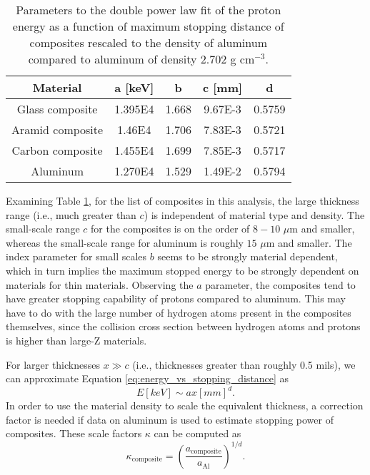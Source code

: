 \documentclass{hitec}
\begin{document}
\begin{table}[h]\centering
	\caption{Parameters to the double power law fit of the proton energy as a function of maximum stopping distance of composites rescaled to the density of aluminum compared to aluminum of density $2.702$ g cm$^{-3}$.}\label{tab:stopping_distance_rescaled}
	\begin{tabular}{|c | c | c | c | c |}\hline
		Material & a [keV] & b & c [mm] & d \\\hline
		Glass composite  & 1.395E4 & 1.668 & 9.67E-3 & 0.5759 \\\hline
		Aramid composite & 1.46E4  & 1.706 & 7.83E-3 & 0.5721  \\\hline
		Carbon composite & 1.455E4 & 1.699 & 7.85E-3 & 0.5717 \\\hline
		Aluminum         & 1.270E4 & 1.529 & 1.49E-2 & 0.5794 \\\hline
	\end{tabular}
\end{table}

Examining Table \ref{tab:stopping_distance_rescaled}, for the list of composites in this analysis, the large thickness range (i.e., much greater than $c$) is independent of material type and density. The small-scale range $c$ for the composites is on the order of $8-10$ $\mu$m and smaller, whereas the small-scale range for aluminum is roughly $15$ $\mu$m and smaller. The index parameter for small scales $b$ seems to be strongly material dependent, which in turn implies the maximum stopped energy to be strongly dependent on materials for thin materials. Observing the $a$ parameter, the composites tend to have greater stopping capability of protons compared to aluminum. This may have to do with the large number of hydrogen atoms present in the composites themselves, since the collision cross section between hydrogen atoms and protons is higher than large-Z materials.

For larger thicknesses $x \gg c$ (i.e., thicknesses greater than roughly 0.5 mils), we can approximate Equation \ref{eq:energy_vs_stopping_distance} as
\begin{equation}\label{eq:energy_vs_stopping_distance-large_dist}
E[keV] \sim a x[mm]^d.
\end{equation}
In order to use the material density to scale the equivalent thickness, a correction factor is needed if data on aluminum is used to estimate stopping power of composites. These scale factors $\kappa$ can be computed as
\begin{equation}
\kappa_{\text{composite}} = \left(\frac{a_{\text{composite}}}{a_{\text{Al}}}\right)^{1/d}.
\end{equation} 
\end{document}

